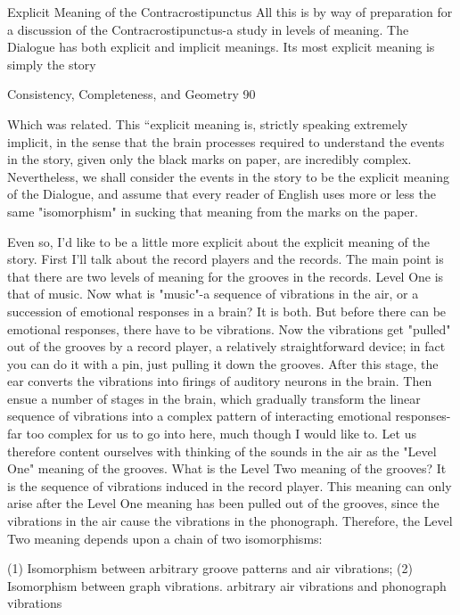                   Explicit Meaning of the Contracrostipunctus
All this is by way of preparation for a discussion of the Contracrostipunctus-a study in
levels of meaning. The Dialogue has both explicit and implicit meanings. Its most
explicit meaning is simply the story




Consistency, Completeness, and Geometry                                                   90

Which was related. This “explicit meaning is, strictly speaking extremely implicit, in the
sense that the brain processes required to understand the events in the story, given only
the black marks on paper, are incredibly complex. Nevertheless, we shall consider the
events in the story to be the explicit meaning of the Dialogue, and assume that every
reader of English uses more or less the same "isomorphism" in sucking that meaning
from the marks on the paper.

         Even so, I'd like to be a little more explicit about the explicit meaning of the story.
First I'll talk about the record players and the records. The main point is that there are two
levels of meaning for the grooves in the records. Level One is that of music. Now what is
"music"-a sequence of vibrations in the air, or a succession of emotional responses in a
brain? It is both. But before there can be emotional responses, there have to be vibrations.
Now the vibrations get "pulled" out of the grooves by a record player, a relatively
straightforward device; in fact you can do it with a pin, just pulling it down the grooves.
After this stage, the ear converts the vibrations into firings of auditory neurons in the
brain. Then ensue a number of stages in the brain, which gradually transform the linear
sequence of vibrations into a complex pattern of interacting emotional responses-far too
complex for us to go into here, much though I would like to. Let us therefore content
ourselves with thinking of the sounds in the air as the "Level One" meaning of the
grooves.
What is the Level Two meaning of the grooves? It is the sequence of vibrations induced
in the record player. This meaning can only arise after the Level One meaning has been
pulled out of the grooves, since the vibrations in the air cause the vibrations in the
phonograph. Therefore, the Level Two meaning depends upon a chain of two
isomorphisms:

               (1) Isomorphism between arbitrary groove patterns and air
                  vibrations;
               (2) Isomorphism between graph vibrations. arbitrary air
                  vibrations and phonograph vibrations

